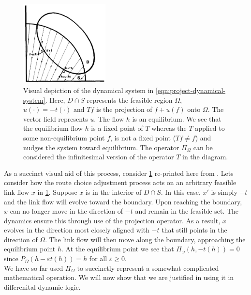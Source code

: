 \begin{figure}[!ht]
    \centering
    \includegraphics[width=0.4\textwidth]{figures/equilibrium-projection.png}
    \caption{Visual depiction of the dynamical system in \eqref{eqn:project-dynamical-system}. Here, $D\cap S$ represents the feasible region $\Omega$, $u(\cdot) = -t(\cdot)$ and $Tf$ is the projection of $f+u(f)$ onto $\Omega$. The vector field represents $u$. The flow $h$ is an equilibrium. We see that the equilibrium flow $h$ is a fixed point of $T$ whereas the $T$ applied to some non-equilibrium point $f$, is not a fixed point ($Tf \neq f$) and nudges the system toward equilibrium. The operator $\Pi_{\Omega}$ can be considered the infinitesimal version of the operator $T$ in the diagram.}
    \label{fig:equilibrium-projection}
\end{figure}

As a succinct visual aid of this process, consider \cref{fig:equilibrium-projection} re-printed here from  \citet{smith1979existence}. 
Lets consider how the route choice adjustment process acts on an arbitrary feasible link flow $x$ in \cref{fig:equilibrium-projection}.
Suppose $x$ is in the interior of $D\cap S$.
In this case, $x'$ is simply $-t$ and the link flow will evolve toward the boundary.
Upon reaching the boundary, $x$ can no longer move in the direction of $-t$ and remain in the feasible set.
The dynamics ensure this through use of the projection operator.
As a result, $x$ evolves in the direction most closely aligned with $-t$ that still points in the direction of $\Omega$.
The link flow will then move along the boundary, approaching the equilibrium point $h$.  
At the equilibrium point we see that $\Pi_{\omega}(h, -t(h))=0$ since $P_{\Omega}(h- \varepsilon t(h)) = h$ for all $\varepsilon \geq 0$.\\

We have so far used $\Pi_\Omega$ to succinctly represent a somewhat complicated mathematical operation. We will now show that we are justified in using it in differenital dynamic logic.


